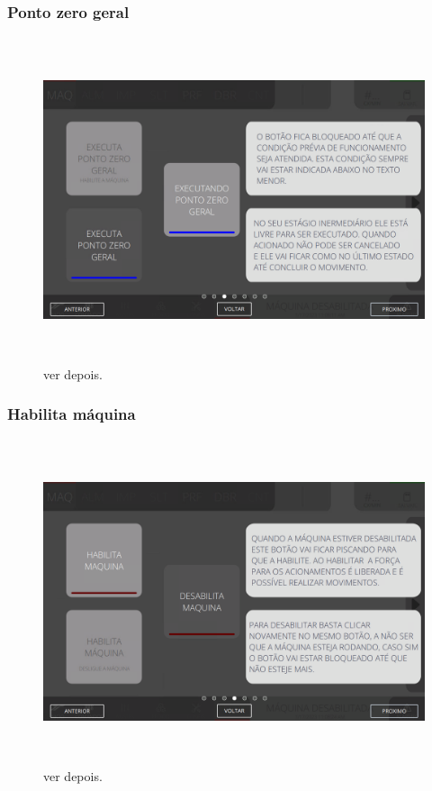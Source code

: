 \vspace*{\fill}

\newpage
\thispagestyle{fancy}

\vspace*{\fill}

\subsubsection{\small{Ponto zero geral}}

\begin{figure}[h]
  \centering
  \includegraphics[width=576px,height=360px]{src/images/02-machine/e-3.png}
  \caption{ver depois.}
   \label{}
\end{figure}

\vspace*{\fill}

\newpage
\thispagestyle{fancy}

\vspace*{\fill}

\subsubsection{\small{Habilita máquina}}

\begin{figure}[h]
  \centering
  \includegraphics[width=576px,height=360px]{src/images/02-machine/e-4.png}
  \caption{ver depois.}
   \label{}
\end{figure}


